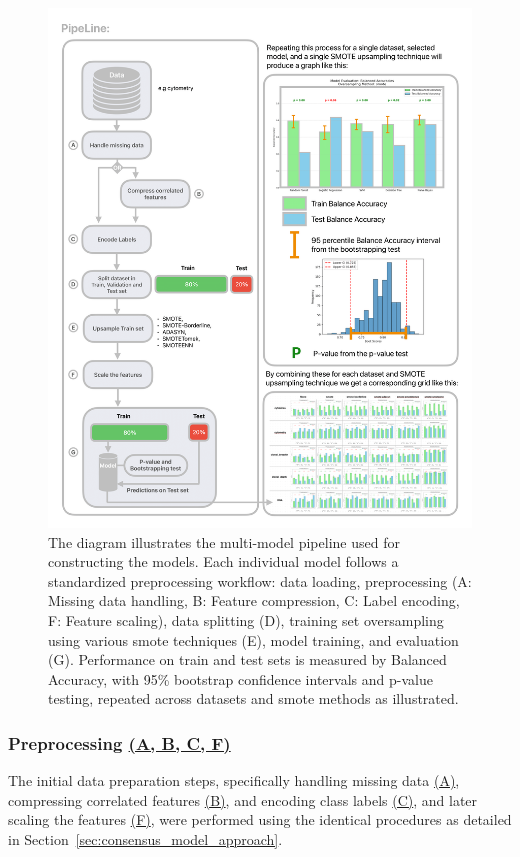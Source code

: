 \documentclass[12pt,a4paper]{report}
\begin{document}
\begin{figure}[H]
  \centering
  \hspace*{-0.9cm} %
  \includegraphics[width=1.1\textwidth]{images/Pipeline-2.png} %
  \caption[Feature Identification models pipeline diagram]{ The diagram illustrates the multi-model pipeline used for constructing the models.  Each individual model follows a standardized preprocessing workflow: data loading, preprocessing (A: Missing data handling, B: Feature compression, C: Label encoding, F: Feature scaling), data splitting (D), training set oversampling using various \gls{smote} techniques (E), model training, and evaluation (G). Performance on train and test sets is measured by Balanced Accuracy, with 95\% bootstrap confidence intervals and p-value testing, repeated across datasets and \gls{smote} methods as illustrated.}
  \label{fig:pipeline-2}
\end{figure}

\subsubsection{Preprocessing \hyperref[fig:pipeline-2]{(A, B, C, F)}} 
\noindent The initial data preparation steps, specifically handling missing data \hyperref[fig:pipeline-2]{(A)}, compressing correlated features \hyperref[fig:pipeline-2]{(B)}, and encoding class labels \hyperref[fig:pipeline-2]{(C)}, and later scaling the features \hyperref[fig:pipeline-2]{(F)}, were performed using the identical procedures as detailed in Section~\ref{sec:consensus_model_approach}.
\end{document}
